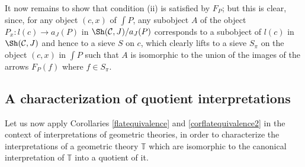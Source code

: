 \documentclass[a4paper,12pt]{article}
\begin{document}
It now remains to show that condition (ii) is satisfied by $F_{P}$; but this is clear, since, for any object $(c, x)$ of $\int P$, any subobject $A$ of the object $P_{x}:l(c)\to a_{J}(P)$ in $\Sh({\cal C}, J)\slash a_{J}(P)$ corresponds to a subobject of $l(c)$ in $\Sh({\cal C}, J)$ and hence to a sieve $S$ on $c$, which clearly lifts to a sieve $S_{\pi}$ on the object $(c, x)$ in $\int P$ such that $A$ is isomorphic to the union of the images of the arrows $F_{P}(f)$ where $f\in S_{\pi}$.  

\subsection{A characterization of quotient interpretations}

Let us now apply Corollaries \ref{flatequivalence} and \ref{corflatequivalence2} in the context of interpretations of geometric theories, in order to characterize the interpretations of a geometric theory $\mathbb T$ which are isomorphic to the canonical interpretation of $\mathbb T$ into a quotient of it.
\end{document}
